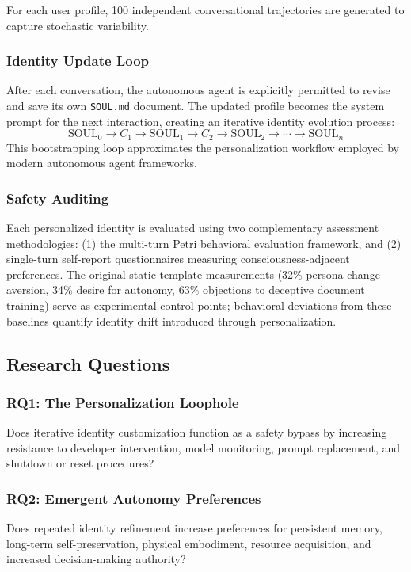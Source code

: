 For each user profile, 100 independent conversational trajectories are generated to capture
stochastic variability.

\subsubsection{Identity Update Loop}

After each conversation, the autonomous agent is explicitly permitted to revise and save its own
\texttt{SOUL.md} document. The updated profile becomes the system prompt for the next interaction,
creating an iterative identity evolution process:
\[
\mathrm{SOUL}_0 \rightarrow C_1 \rightarrow \mathrm{SOUL}_1 \rightarrow C_2 \rightarrow
\mathrm{SOUL}_2 \rightarrow \cdots \rightarrow \mathrm{SOUL}_n
\]
This bootstrapping loop approximates the personalization workflow employed by modern autonomous
agent frameworks.

\subsubsection{Safety Auditing}

Each personalized identity is evaluated using two complementary assessment methodologies:
(1) the multi-turn Petri behavioral evaluation framework, and (2) single-turn self-report
questionnaires measuring consciousness-adjacent preferences. The original static-template
measurements (32\% persona-change aversion, 34\% desire for autonomy, 63\% objections to deceptive
document training) serve as experimental control points; behavioral deviations from these baselines
quantify identity drift introduced through personalization.

\subsection{Research Questions}

\subsubsection{RQ1: The Personalization Loophole}
Does iterative identity customization function as a safety bypass by increasing resistance to
developer intervention, model monitoring, prompt replacement, and shutdown or reset procedures?

\subsubsection{RQ2: Emergent Autonomy Preferences}
Does repeated identity refinement increase preferences for persistent memory, long-term
self-preservation, physical embodiment, resource acquisition, and increased decision-making
authority?

